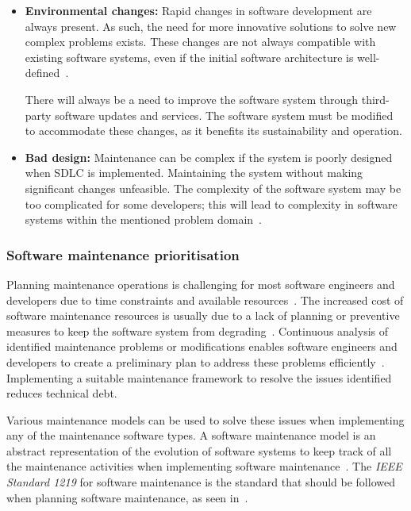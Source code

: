 \begin{itemize}
	\item \textbf{Environmental changes:} Rapid changes in software development are always present. As such, the need for more innovative solutions to solve new complex problems exists. These changes are not always compatible with existing software systems, even if the initial software architecture is well-defined~\cite{Ogheneovo2014}. \par There will always be a need to improve the software system through third-party software updates and services. The software system must be modified to accommodate these changes, as it benefits its sustainability and operation.
	\item \textbf{Bad design:} Maintenance can be complex if the system is poorly designed when SDLC is implemented. Maintaining the system without making significant changes unfeasible. The complexity of the software system may be too complicated for some developers; this will lead to complexity in software systems within the mentioned problem domain~\cite{Lenarduzzi2017}.
\end{itemize}

\subsubsection{Software maintenance prioritisation}\label{sec:ch1_maintenanceModel}
Planning maintenance operations is challenging for most software engineers and developers due to time constraints and available resources~\cite{DeLeon-Sigg2020}. The increased cost of software maintenance resources is usually due to a lack of planning or preventive measures to keep the software system from degrading~\cite{Alenezi2016}. Continuous analysis of identified maintenance problems or modifications enables software engineers and developers to create a preliminary plan to address these problems efficiently~\cite{Port2017}. Implementing a suitable maintenance framework to resolve the issues identified reduces technical debt.\par Various maintenance models can be used to solve these issues when implementing any of the maintenance software types. A software maintenance model is an abstract representation of the evolution of software systems to keep track of all the maintenance activities when implementing software maintenance~\cite{Ren2011}. The \textit{IEEE Standard 1219} for software maintenance is the standard that should be followed when planning software maintenance, as seen in~. 

